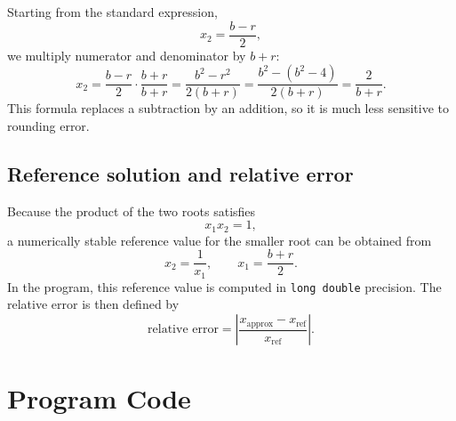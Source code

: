 \documentclass[12pt,a4paper]{article}
\begin{document}
Starting from the standard expression,
\[
 x_2=\frac{b-r}{2},
\]
we multiply numerator and denominator by $b+r$:
\[
 x_2 = \frac{b-r}{2}\cdot\frac{b+r}{b+r}
 = \frac{b^2-r^2}{2(b+r)}
 = \frac{b^2-(b^2-4)}{2(b+r)}
 = \frac{2}{b+r}.
\]
This formula replaces a subtraction by an addition, so it is much less sensitive to rounding error.

\subsection*{Reference solution and relative error}

Because the product of the two roots satisfies
\[
 x_1x_2=1,
\]
a numerically stable reference value for the smaller root can be obtained from
\[
 x_2=\frac{1}{x_1},
 \qquad
 x_1=\frac{b+r}{2}.
\]
In the program, this reference value is computed in \texttt{long double} precision. The relative error is then defined by
\[
 \text{relative error} = \left|\frac{x_{\text{approx}}-x_{\text{ref}}}{x_{\text{ref}}}\right|.
\]

\section{Program Code}
\end{document}
